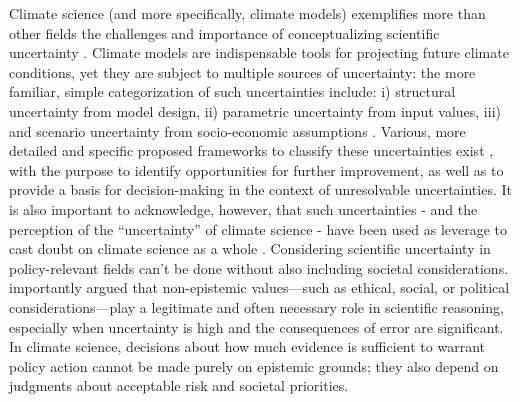 \documentclass[acp, manuscript]{copernicus}
\begin{document}
Climate science (and more specifically, climate models) exemplifies more than other fields the challenges and importance of conceptualizing scientific uncertainty \citep[see, for instance, the work of Elizabeth Lloyd, especially][]{Lloyd_2010}.  Climate models are indispensable tools for projecting future climate conditions, yet they are subject to multiple sources of uncertainty: the more familiar, simple categorization of such uncertainties include: i) structural uncertainty from model design, ii) parametric uncertainty from input values, iii) and scenario uncertainty from socio-economic assumptions  \citep{Hawkins2009,Lehner2020}. Various, more detailed and specific proposed frameworks to classify these uncertainties exist \citep{Frigg2015,BEVAN2022102919} , with the purpose to identify opportunities for further improvement, as well as to provide a basis for decision-making in the context of unresolvable uncertainties. It is also important to acknowledge, however, that such uncertainties - and the perception of the ``uncertainty'' of climate science - have been used as leverage to cast doubt on climate science as a whole \citep{LEWANDOWSKY20151}.
Considering scientific uncertainty in policy-relevant fields can’t be done without also including societal considerations. \citep{Douglas2009-DOUSPA-2} importantly argued that non-epistemic values—such as ethical, social, or political considerations—play a legitimate and often necessary role in scientific reasoning, especially when uncertainty is high and the consequences of error are significant.  In climate science, decisions about how much evidence is sufficient to warrant policy action cannot be made purely on epistemic grounds; they also depend on judgments about acceptable risk and societal priorities.\\
\end{document}
